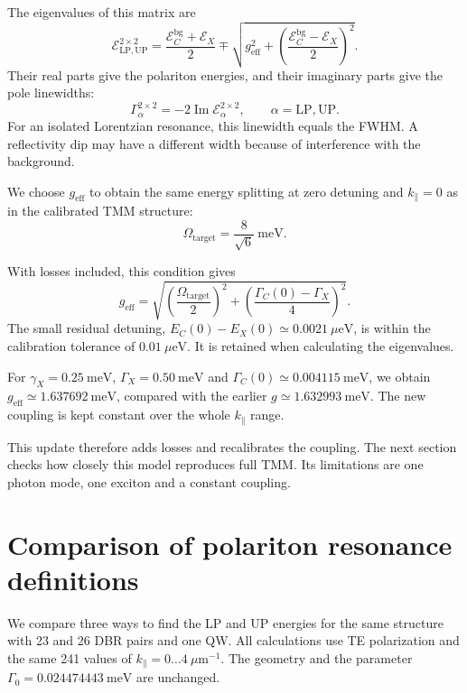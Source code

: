 \documentclass[12pt,a4paper]{article}
\begin{document}
The eigenvalues of this matrix are
\[
\mathcal E_{\mathrm{LP,UP}}^{2\times2}
=\frac{\mathcal E_C^{\mathrm{bg}}+\mathcal E_X}{2}
\mp\sqrt{g_{\mathrm{eff}}^2+
\left(\frac{\mathcal E_C^{\mathrm{bg}}-\mathcal E_X}{2}\right)^2}.
\]
Their real parts give the polariton energies, and their imaginary parts give the pole linewidths:
\[
\Gamma_\alpha^{2\times2}
=-2\operatorname{Im}\mathcal E_\alpha^{2\times2},
\qquad \alpha=\mathrm{LP,UP}.
\]
For an isolated Lorentzian resonance, this linewidth equals the FWHM. A reflectivity dip may have a different width because of interference with the background.

\par\noindent\begin{minipage}{\textwidth}
We choose $g_{\mathrm{eff}}$ to obtain the same energy splitting at zero detuning and $k_\parallel=0$ as in the calibrated TMM structure:
\[
\Omega_{\mathrm{target}}=\frac{8}{\sqrt{6}}\ \mathrm{meV}.
\]
\end{minipage}\par
With losses included, this condition gives
\[
g_{\mathrm{eff}}=
\sqrt{
\left(\frac{\Omega_{\mathrm{target}}}{2}\right)^2+
\left(\frac{\Gamma_C(0)-\Gamma_X}{4}\right)^2
}.
\]
The small residual detuning, $E_C(0)-E_X(0)\simeq0.0021\ \mu\mathrm{eV}$, is within the calibration tolerance of $0.01\ \mu\mathrm{eV}$. It is retained when calculating the eigenvalues.

For $\gamma_X=0.25\ \mathrm{meV}$, $\Gamma_X=0.50\ \mathrm{meV}$ and $\Gamma_C(0)\simeq0.004115\ \mathrm{meV}$, we obtain $g_{\mathrm{eff}}\simeq1.637692\ \mathrm{meV}$, compared with the earlier $g\simeq1.632993\ \mathrm{meV}$. The new coupling is kept constant over the whole $k_\parallel$ range.

This update therefore adds losses and recalibrates the coupling. The next section checks how closely this model reproduces full TMM. Its limitations are one photon mode, one exciton and a constant coupling.

\clearpage
\section{Comparison of polariton resonance definitions}\label{sec:complex-comparison}

We compare three ways to find the LP and UP energies for the same structure with 23 and 26 DBR pairs and one QW. All calculations use TE polarization and the same 241 values of $k_\parallel=0\ldots4\ \mu\mathrm m^{-1}$. The geometry and the parameter $\Gamma_0=0.024474443\ \mathrm{meV}$ are unchanged.
\end{document}

